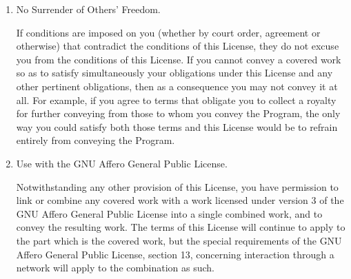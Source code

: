 \begin{enumerate}
A patent license is ``discriminatory'' if it does not include within
the scope of its coverage, prohibits the exercise of, or is
conditioned on the non-exercise of one or more of the rights that are
specifically granted under this License.  You may not convey a covered
work if you are a party to an arrangement with a third party that is
in the business of distributing software, under which you make payment
to the third party based on the extent of your activity of conveying
the work, and under which the third party grants, to any of the
parties who would receive the covered work from you, a discriminatory
patent license (a) in connection with copies of the covered work
conveyed by you (or copies made from those copies), or (b) primarily
for and in connection with specific products or compilations that
contain the covered work, unless you entered into that arrangement,
or that patent license was granted, prior to 28 March 2007.

Nothing in this License shall be construed as excluding or limiting
any implied license or other defenses to infringement that may
otherwise be available to you under applicable patent law.

\item No Surrender of Others' Freedom.

If conditions are imposed on you (whether by court order, agreement or
otherwise) that contradict the conditions of this License, they do not
excuse you from the conditions of this License.  If you cannot convey a
covered work so as to satisfy simultaneously your obligations under this
License and any other pertinent obligations, then as a consequence you may
not convey it at all.  For example, if you agree to terms that obligate you
to collect a royalty for further conveying from those to whom you convey
the Program, the only way you could satisfy both those terms and this
License would be to refrain entirely from conveying the Program.

\item Use with the GNU Affero General Public License.

Notwithstanding any other provision of this License, you have
permission to link or combine any covered work with a work licensed
under version 3 of the GNU Affero General Public License into a single
combined work, and to convey the resulting work.  The terms of this
License will continue to apply to the part which is the covered work,
but the special requirements of the GNU Affero General Public License,
section 13, concerning interaction through a network will apply to the
combination as such.


\end{enumerate}
